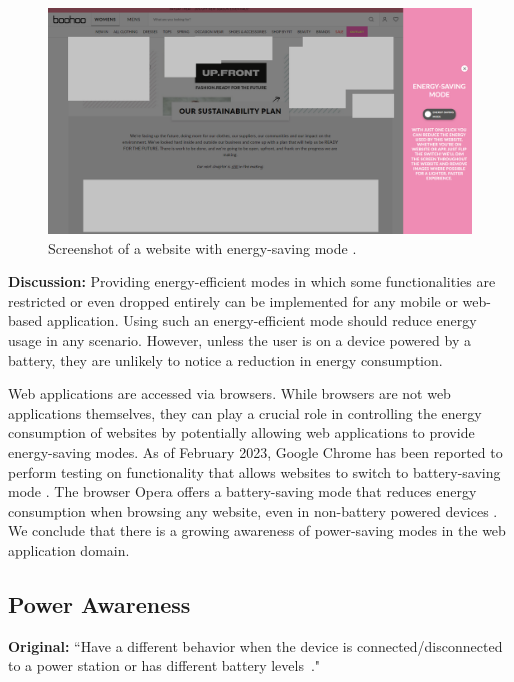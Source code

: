 \begin{figure}
    \centering
    \includegraphics[width=\linewidth]{RQ1/Img/boohoo.png}
    \caption{Screenshot of a website with energy-saving mode \cite{boohoo-website}.}
    \label{fig:boohoo}
\end{figure}

\textbf{Discussion:} Providing energy-efficient modes in which some functionalities are restricted or even dropped entirely can be implemented for any mobile or web-based application. Using such an energy-efficient mode should reduce energy usage in any scenario. However, unless the user is on a device powered by a battery, they are unlikely to notice a reduction in energy consumption. 

Web applications are accessed via browsers. While browsers are not web applications themselves, they can play a crucial role in controlling the energy consumption of websites by potentially allowing web applications to provide energy-saving modes. As of February 2023, Google Chrome has been reported to perform testing on functionality that allows websites to switch to battery-saving mode \cite{chrome_battery_saving_mode} \cite{github_battery_saving_demo}. The browser Opera offers a battery-saving mode that reduces energy consumption when browsing any website, even in non-battery powered devices \cite{opera-battery-saver}. We conclude that there is a growing awareness of power-saving modes in the web application domain.

\subsection{Power Awareness} \label{sec:patterns-PowerAwareness}
\textbf{Original:} ``Have a different behavior when the device is connected/disconnected to a power station or has different battery levels~\cite{cruz2019catalog}."

